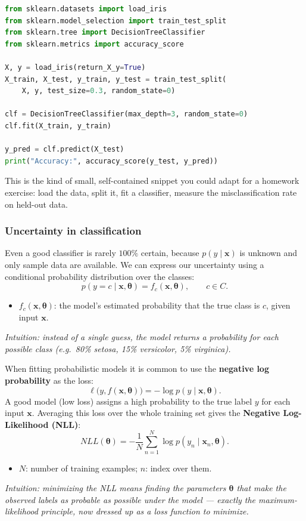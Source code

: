 \begin{example}
\vs
\begin{lstlisting}[language=Python, caption={A minimal classifier on the Iris dataset}]
from sklearn.datasets import load_iris
from sklearn.model_selection import train_test_split
from sklearn.tree import DecisionTreeClassifier
from sklearn.metrics import accuracy_score

X, y = load_iris(return_X_y=True)
X_train, X_test, y_train, y_test = train_test_split(
    X, y, test_size=0.3, random_state=0)

clf = DecisionTreeClassifier(max_depth=3, random_state=0)
clf.fit(X_train, y_train)

y_pred = clf.predict(X_test)
print("Accuracy:", accuracy_score(y_test, y_pred))
\end{lstlisting}
This is the kind of small, self-contained snippet you could adapt for a homework exercise: load the data, split it, fit a classifier, measure the misclassification rate on held-out data.
\end{example}

\subsubsection{Uncertainty in classification}

Even a good classifier is rarely $100\%$ certain, because $p(y \mid \mathbf{x})$ is unknown and only sample data are available. We can express our uncertainty using a conditional probability distribution over the classes:
\[
  p(y = c \mid \mathbf{x}, \boldsymbol\theta) = f_c(\mathbf{x}, \boldsymbol\theta), \qquad c \in C.
\]
\begin{itemize}
  \item $f_c(\mathbf{x}, \boldsymbol\theta)$: the model's estimated probability that the true class is $c$, given input $\mathbf{x}$.
\end{itemize}
\textit{Intuition: instead of a single guess, the model returns a probability for each possible class (e.g.\ 80\% setosa, 15\% versicolor, 5\% virginica).}

When fitting probabilistic models it is common to use the \textbf{negative log probability} as the loss:
\[
  \ell\bigl(y, f(\mathbf{x}, \boldsymbol\theta)\bigr) = -\log p(y \mid \mathbf{x}, \boldsymbol\theta).
\]
A good model (low loss) assigns a high probability to the true label $y$ for each input $\mathbf{x}$. Averaging this loss over the whole training set gives the \textbf{Negative Log-Likelihood (NLL)}:
\[
  NLL(\boldsymbol\theta) = -\frac{1}{N}\sum_{n=1}^{N} \log p(y_n \mid \mathbf{x}_n, \boldsymbol\theta).
\]
\begin{itemize}
  \item $N$: number of training examples; $n$: index over them.
\end{itemize}
\textit{Intuition: minimizing the NLL means finding the parameters $\boldsymbol\theta$ that make the observed labels as probable as possible under the model — exactly the maximum-likelihood principle, now dressed up as a loss function to minimize.}

